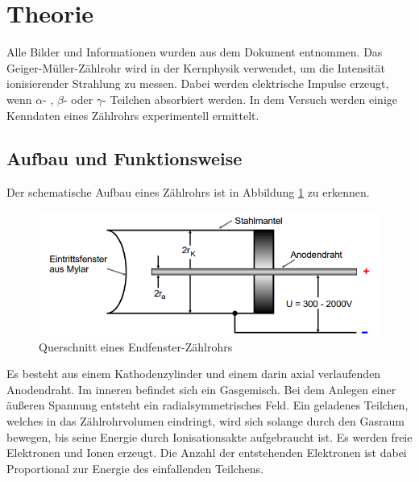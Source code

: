 \section{Theorie}
\label{sec:Theorie}
Alle Bilder und Informationen wurden aus dem Dokument \cite{v703} entnommen.
Das Geiger-Müller-Zählrohr wird in der Kernphysik verwendet, um die Intensität ionisierender Strahlung zu messen.
Dabei werden elektrische Impulse erzeugt, wenn $\alpha$- , $\beta$- oder $\gamma$- Teilchen absorbiert werden. In dem Versuch werden
einige Kenndaten eines Zählrohrs experimentell ermittelt.
\subsection{Aufbau und Funktionsweise}
Der schematische Aufbau eines Zählrohrs ist in Abbildung \ref{fig:aufbau} zu erkennen.
\begin{figure}
    \centering
    \includegraphics[scale=0.4]{pics/Aufbau.png}
    \caption{Querschnitt eines Endfenster-Zählrohrs}
    \label{fig:aufbau}
  \end{figure}
Es besteht aus einem Kathodenzylinder und einem darin axial verlaufenden Anodendraht. Im inneren befindet sich ein Gasgemisch.
Bei dem Anlegen einer äußeren Spannung entsteht ein radialsymmetrisches Feld. Ein geladenes Teilchen, welches in das Zählrohrvolumen eindringt,
wird sich solange durch den Gasraum bewegen, bis seine Energie durch Ionisationsakte aufgebraucht ist. 
Es werden freie Elektronen und Ionen erzeugt. Die Anzahl der entstehenden Elektronen ist dabei Proportional zur Energie des einfallenden Teilchens.
